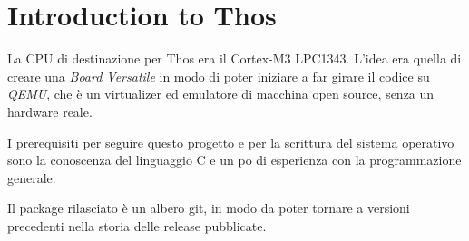 \documentclass[a4paper,12pt]{report}
\begin{document}
\section{Introduction to Thos}

La CPU di destinazione per Thos era il Cortex-M3 LPC1343. L'idea era quella di creare una \textit{Board Versatile} in modo di poter iniziare a far girare il codice su \textit{QEMU}, che è un virtualizer ed emulatore di macchina open source, senza un hardware reale.


I prerequisiti per seguire questo progetto e per la scrittura del sistema operativo sono la conoscenza del linguaggio C e un po di esperienza con la programmazione generale. 

Il package rilasciato è un albero git, in modo da poter tornare a versioni precedenti nella storia delle release pubblicate.



%
%
%
%
%
%
%
\end{document}
